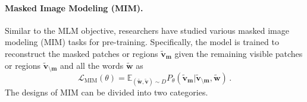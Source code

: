 \paragraph{Masked Image Modeling (MIM).} Similar to the MLM objective, researchers have studied various masked image modeling (MIM) tasks for pre-training. Specifically, the model is trained to reconstruct the masked patches or regions $\tilde{\mathbf{v}}_{\mathbf{m}}$ given the remaining visible patches or regions $\tilde{\mathbf{v}}_{\setminus \mathbf{m}}$ and all the words $\tilde{\mathbf{w}}$ as 
\begin{equation}
    \mathcal{L}_{\text{MIM}}(\theta) = \mathbb{E}_{(\tilde{\mathbf{w}}, \tilde{\mathbf{v}})\sim D} P_{\theta}(\tilde{\mathbf{v}}_\mathbf{m} | \tilde{\mathbf{v}}_{\setminus \mathbf{m}}, \tilde{\mathbf{w}})\,.
\end{equation}
The designs of MIM can be divided into two categories.
